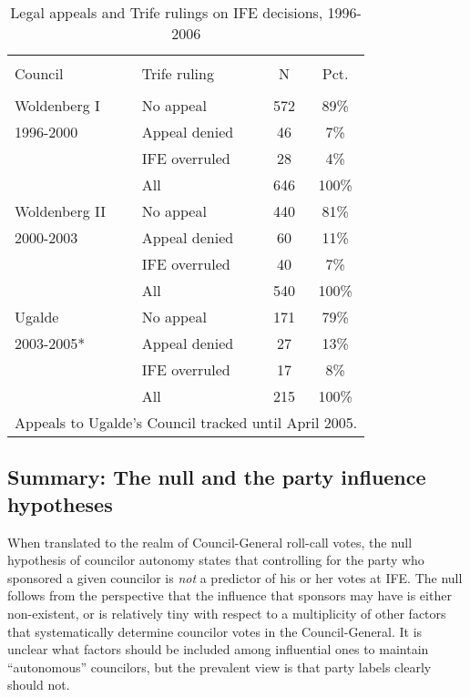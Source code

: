 \documentclass[12 pt, letter]{article}
\begin{document}
\begin{table}
\caption{Legal appeals and {\sc Trife} rulings on IFE decisions, 1996-2006}\label{T:rulings}
\begin{center}
\begin{tabular}{llcc}
\hline\\ [-1.5ex]
Council & {\sc Trife} ruling &  N  & Pct. \\
\hline \\ [-1ex]
Woldenberg I & No appeal  & 572 &  89\% \\
1996-2000 & Appeal denied &  46 &   7\% \\
          & IFE overruled &  28 &   4\% \\
          & All           & 646 & 100\% \\ [1.2ex]
Woldenberg II & No appeal & 440 &  81\% \\
2000-2003 & Appeal denied &  60 &  11\% \\
          & IFE overruled &  40 &   7\% \\
          & All           & 540 & 100\% \\ [1.2ex]
Ugalde    & No appeal     & 171 &  79\% \\
2003-2005* & Appeal denied &  27 &  13\% \\
          & IFE overruled &  17 &   8\% \\
          & All           & 215 & 100\% \\
\hline \multicolumn{4}{l}{\small * Appeals to Ugalde's Council
tracked until April 2005.}
\end{tabular}
\end{center}
\end{table}


\subsection{Summary: The null and the party influence hypotheses}
When translated to the realm of Council-General roll-call votes, the
null hypothesis of councilor autonomy states that controlling for
the party who sponsored a given councilor is \emph{not} a predictor
of his or her votes at IFE. The null follows from the perspective
that the influence that sponsors may have is either non-existent, or
is relatively tiny with respect to a multiplicity of other factors
that systematically determine councilor votes in the
Council-General. It is unclear what factors should be included among
influential ones to maintain ``autonomous'' councilors, but the
prevalent view is that party labels clearly should not.
\end{document}
